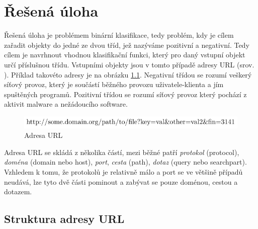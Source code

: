 \chapter{Řešená úloha}\label{problem}

Řešená úloha je problémem binární klasifikace, tedy problém, kdy je cílem zařadit objekty do jedné ze dvou tříd, jež nazýváme pozitivní a negativní. Tedy cílem je navrhnout vhodnou klasifikační funkci, který pro daný vstupní objekt určí příslušnou třídu. Vstupními objekty jsou v tomto případě adresy URL (srov. \cite{berners-lee_uniform_1994}). Příklad takovéto adresy je na obrázku \ref{url}. Negativní třídou se rozumí veškerý síťový provoz, který je součástí běžného provozu uživatele-klienta a jím spuštěných programů. Pozitivní třídou se rozumí síťový provoz který pochází z aktivit malware a nežádoucího software.

\begin{figure}[h]
	\caption{Adresa URL}\label{url}
	\centering
	\includegraphics{images/url/url.pdf}
\end{figure}

Adresa URL se skládá z několika částí, mezi běžné patří \textit{protokol} (\textenglish{protocol}), \textit{doména} (\textenglish{domain} nebo \textenglish{host}), \textit{port}, \textit{cesta} (\textenglish{path}), \textit{dotaz} (\textenglish{query} nebo \textenglish{searchpart}). Vzhledem k tomu, že protokolů je relativně málo a port se ve většině případů neudává, lze tyto dvě části pominout a zabývat se pouze doménou, cestou a dotazem.

\section{Struktura adresy URL}\label{URL_structure}

